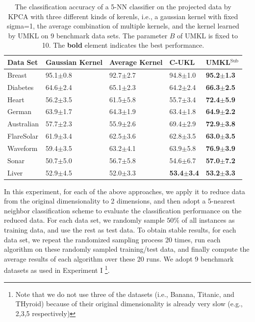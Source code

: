 \begin{table}[!thbp] \label{table:KPCA}
\centering \caption{The classification accuracy of a 5-NN classifier on the projected data by KPCA with three different kinds of kerenls, i.e., a gaussian kernel with fixed sigma=1, the average combination of multiple kernels, and the kernel learned by UMKL on 9 benchmark data sets. The parameter $B$ of UMKL is fixed to 10. The {\bf bold} element indicates the best performance.}
\begin{center}
{%
\begin{tabular}{l|l|l|l|l|}
\hline
Data Set  & Gaussian Kernel &Average Kernel &C-UKL
    &UMKL$^{\mathrm{Sub}}$\\
\hline
\hline              %
Breast          &95.1$\pm$0.8      &92.7$\pm$2.7 &94.8$\pm$1.0   &{\bf95.2$\pm$1.3}  \\
Diabetes       &64.6$\pm$2.4  &65.1$\pm$2.3  &64.2$\pm$2.4   &{\bf66.3$\pm$2.5} \\
Heart          &56.2$\pm$3.5    &61.5$\pm$5.8   &55.7$\pm$3.4 &{\bf72.4$\pm$5.9} \\
German          &63.9$\pm$1.7   &64.3$\pm$1.9   &63.4$\pm$1.8   &{\bf64.9$\pm$2.2}\\
Australian     &57.7$\pm$2.3  &55.9$\pm$2.6  &69.4$\pm$2.9   &{\bf72.9$\pm$3.8} \\
FlareSolar     &61.9$\pm$3.4 &62.5$\pm$3.6   &62.8$\pm$3.5   &{\bf63.0$\pm$3.5}\\
Waveform    &59.4$\pm$3.5 &63.2$\pm$4.1   &63.9$\pm$5.8 &{\bf 76.9$\pm$3.9} \\
Sonar         &50.7$\pm$5.0 &56.7$\pm$5.8 &54.6$\pm$6.7 &{\bf 57.0$\pm$7.2} \\
Liver       &52.9$\pm$4.5       &52.0$\pm$3.3 &{\bf 53.4$\pm$3.4}   &{\bf 53.2$\pm$3.3} \\
\hline
\end{tabular}
}
\end{center}
\end{table}


In this experiment, for each of the above approaches, we apply it to reduce data from the original dimensionality to 2 dimensions, and then adopt a 5-nearest neighbor classification scheme to evaluate the classification performance on the reduced data.  For each data set, we randomly sample $50\%$ of all instances as training data, and use the rest as test data. To obtain stable results, for each data set, we repeat the randomized sampling process 20 times, run each algorithm on these randomly sampled training/test data, and finally compute the average results of each algorithm over these 20 runs. We adopt 9 benchmark datasets as used in Experiment I \footnote{Note that we do not use three of the datasets (i.e., Banana, Titanic, and THyroid) because of their original dimensionality is already very slow (e.g., 2,3,5 respectively)}.



